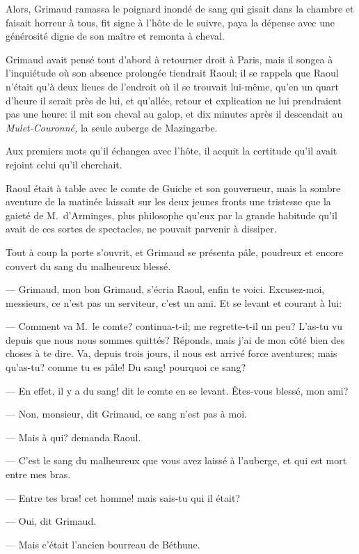 Alors, Grimaud ramassa le poignard inondé de sang qui gisait dans la chambre et faisait horreur à tous, fit signe à l'hôte de le suivre, paya la dépense avec une générosité digne de son maître et remonta à cheval.

Grimaud avait pensé tout d'abord à retourner droit à Paris, mais il songea à l'inquiétude où son absence prolongée tiendrait Raoul; il se rappela que Raoul n'était qu'à deux lieues de l'endroit où il se trouvait lui-même, qu'en un quart d'heure il serait près de lui, et qu'allée, retour et explication ne lui prendraient pas une heure: il mit son cheval au galop, et dix minutes après il descendait au  \textit{Mulet-Couronné,} la seule auberge de Mazingarbe.

Aux premiers mots qu'il échangea avec l'hôte, il acquit la certitude qu'il avait rejoint celui qu'il cherchait.

Raoul était à table avec le comte de Guiche et son gouverneur, mais la sombre aventure de la matinée laissait sur les deux jeunes fronts une tristesse que la gaieté de M.~d'Arminges, plus philosophe qu'eux par la grande habitude qu'il avait de ces sortes de spectacles, ne pouvait parvenir à dissiper.

Tout à coup la porte s'ouvrit, et Grimaud se présenta pâle, poudreux et encore couvert du sang du malheureux blessé.

— Grimaud, mon bon Grimaud, s'écria Raoul, enfin te voici. Excusez-moi, messieurs, ce n'est pas un serviteur, c'est un ami.
Et se levant et courant à lui:

— Comment va M.~le comte? continua-t-il; me regrette-t-il un peu? L'as-tu vu depuis que nous nous sommes quittés? Réponds, mais j'ai de mon côté bien des choses à te dire. Va, depuis trois jours, il nous est arrivé force aventures; mais qu'as-tu? comme tu es pâle! Du sang! pourquoi ce sang?

— En effet, il y a du sang! dit le comte en se levant. Êtes-vous blessé, mon ami?

— Non, monsieur, dit Grimaud, ce sang n'est pas à moi.

— Mais à qui? demanda Raoul.

— C'est le sang du malheureux que vous avez laissé à l'auberge, et qui est mort entre mes bras.

— Entre tes bras! cet homme! mais sais-tu qui il était?

— Oui, dit Grimaud.

— Mais c'était l'ancien bourreau de Béthune.

